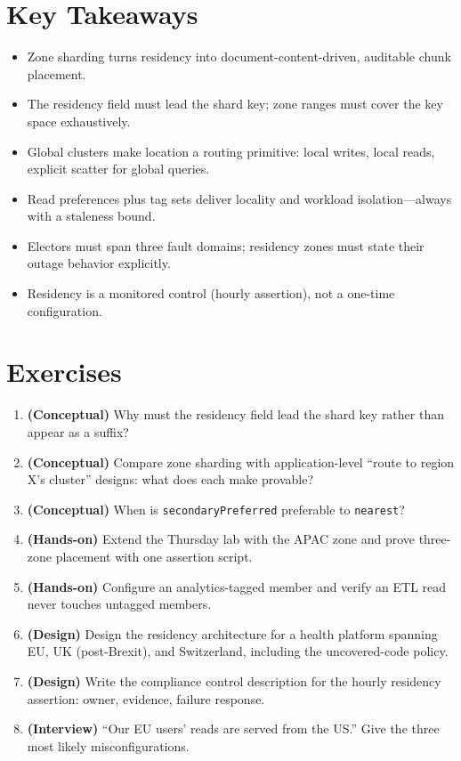 \section*{Key Takeaways}
\begin{itemize}
    \item Zone sharding turns residency into document-content-driven, auditable chunk placement.
    \item The residency field must lead the shard key; zone ranges must cover the key space exhaustively.
    \item Global clusters make location a routing primitive: local writes, local reads, explicit scatter for global queries.
    \item Read preferences plus tag sets deliver locality and workload isolation---always with a staleness bound.
    \item Electors must span three fault domains; residency zones must state their outage behavior explicitly.
    \item Residency is a monitored control (hourly assertion), not a one-time configuration.
\end{itemize}

\section{Exercises}
\begin{enumerate}
    \item \textbf{(Conceptual)} Why must the residency field lead the shard key rather than appear as a suffix?
    \item \textbf{(Conceptual)} Compare zone sharding with application-level ``route to region X's cluster'' designs: what does each make provable?
    \item \textbf{(Conceptual)} When is \texttt{secondaryPreferred} preferable to \texttt{nearest}?
    \item \textbf{(Hands-on)} Extend the Thursday lab with the APAC zone and prove three-zone placement with one assertion script.
    \item \textbf{(Hands-on)} Configure an analytics-tagged member and verify an ETL read never touches untagged members.
    \item \textbf{(Design)} Design the residency architecture for a health platform spanning EU, UK (post-Brexit), and Switzerland, including the uncovered-code policy.
    \item \textbf{(Design)} Write the compliance control description for the hourly residency assertion: owner, evidence, failure response.
    \item \textbf{(Interview)} ``Our EU users' reads are served from the US.'' Give the three most likely misconfigurations.
\end{enumerate}

